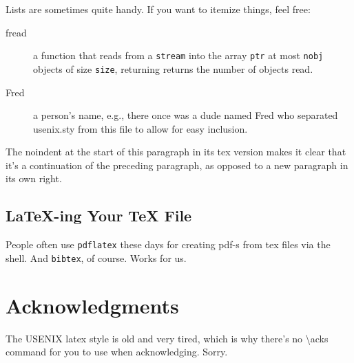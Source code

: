 Lists are sometimes quite handy. If you want to itemize things, feel
free:

\begin{description}
  
\item[fread] a function that reads from a \texttt{stream} into the
  array \texttt{ptr} at most \texttt{nobj} objects of size
  \texttt{size}, returning returns the number of objects read.

\item[Fred] a person's name, e.g., there once was a dude named Fred
  who separated usenix.sty from this file to allow for easy
  inclusion.
\end{description}

\noindent
The noindent at the start of this paragraph in its tex version makes
it clear that it's a continuation of the preceding paragraph, as
opposed to a new paragraph in its own right.


\subsection{LaTeX-ing Your TeX File}

People often use \texttt{pdflatex} these days for creating pdf-s from
tex files via the shell. And \texttt{bibtex}, of course. Works for us.

\section*{Acknowledgments}

The USENIX latex style is old and very tired, which is why
there's no \textbackslash{}acks command for you to use when
acknowledging. Sorry.







